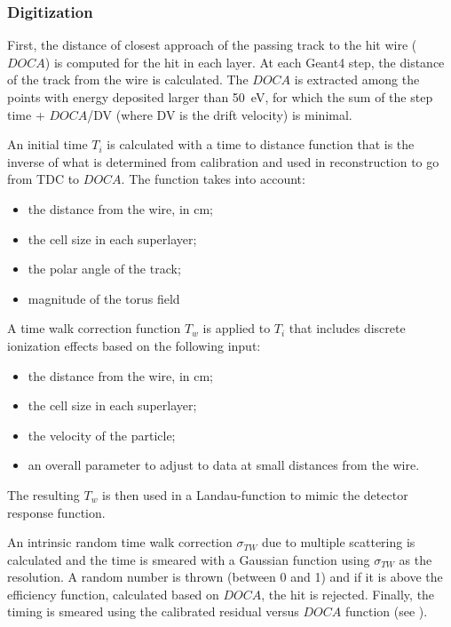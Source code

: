\subsubsection{Digitization}

First, the distance of closest approach of the passing track to the hit wire ($DOCA$) is computed for the hit in each layer.
At each Geant4 step, the distance of the track from the wire is calculated.
The $DOCA$ is extracted among the points with energy deposited larger than 50~eV,
for which the sum of the step time + $DOCA$/DV (where DV is the drift velocity) is minimal.

An initial time $T_i$ is calculated with a time to distance function that is the inverse of
what is determined from calibration and used in reconstruction to go from TDC to $DOCA$.
The function takes into account:

\begin{itemize}
	\item the distance from the wire, in cm;
	\item the cell size in each superlayer;
	\item the polar angle of the track;
	\item magnitude of the torus field
\end{itemize}

A time walk correction function $T_w$ is applied to $T_i$ that includes discrete ionization effects based on the following input:

\begin{itemize}
	\item the distance from the wire, in cm;
	\item the cell size in each superlayer;
	\item the velocity of the particle;
	\item an overall parameter to adjust to data at small distances from the wire.
\end{itemize}

\noindent The resulting $T_w$ is then used in a Landau-function to mimic the detector response function.

An intrinsic random time walk correction $\sigma_{TW}$ due to multiple scattering is calculated and the time is smeared with
a Gaussian function using $\sigma_{TW}$ as the resolution.
A random number is thrown (between 0 and 1) and if it is above the efficiency function, calculated based on $DOCA$,
the hit is rejected.
Finally, the timing is smeared using the calibrated residual versus $DOCA$ function (see ).

